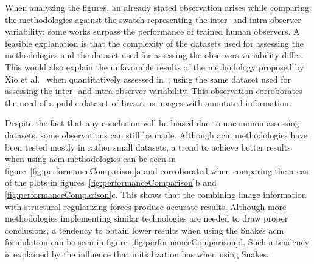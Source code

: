 \documentclass[authoryear,preprint,review,12pt]{elsarticle}
\begin{document}
When analyzing the figures, an already stated observation arises while comparing the methodologies against the swatch representing the inter- and intra-observer variability: some works surpass the performance of trained human observers. A feasible explanation is that the complexity of the datasets used for assessing the methodologies and the dataset used for assessing the observers variability differ. This would also explain the unfavorable results of the methodology proposed by Xio et al.~\cite{Xiao:2002p5639} when quantitatively assessed in~\cite{gerard2013}, using the same dataset used for assessing the inter- and intra-observer variability. This observation corroborates the need of a public dataset of breast \ac{us} images with annotated information.

Despite the fact that any conclusion will be biased due to uncommon assessing datasets,  some observations can still be made. 
Although \ac{acm} methodologies have been tested mostly in rather small datasets,  a trend to achieve better results when using \ac{acm} methodologies can be seen in figure~\ref{fig:performanceComparison}a and corroborated when comparing the areas of the plots in figures~\ref{fig:performanceComparison}b and \ref{fig:performanceComparison}c. This shows that the combining image information with structural regularizing forces produce accurate results. Although more methodologies implementing similar technologies are needed to draw proper conclusions, a tendency to obtain lower results when using the Snakes \ac{acm} formulation can be seen in figure~\ref{fig:performanceComparison}d. Such a tendency is explained by the influence that initialization has when using Snakes.


\end{document}
